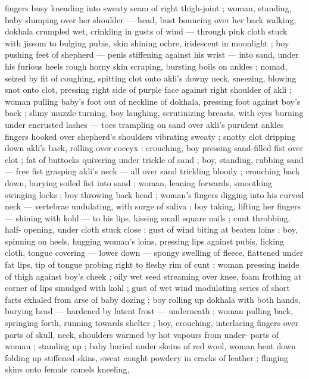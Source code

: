 fingers busy kneading into sweaty seam of right thigh-joint ; woman, 
standing, baby slumping over her shoulder --- head, bust bouncing 
over her back {\dashcom} walking, dokhala crumpled wet, crinkling in gusts 
of wind --- through pink cloth stuck with jissom to bulging pubis, skin 
shining ochre, iridescent in moonlight ; boy pushing feet of shepherd 
--- penis stiffening against his wrist --- into sand, under his furious 
heels {\col} rough horny skin scraping, bursting boils on ankles ; nomad, 
seized by fit of coughing, spitting clot onto akli's downy neck, 
sneezing, blowing snot onto clot, pressing right side of purple face 
against right shoulder of akli ; woman pulling baby's foot out of 
neckline of dokhala, pressing foot against boy's back ; slimy muzzle 
turning, boy laughing, scrutinizing breasts, with eyes burning under 
encrusted lashes --- toes trampling on sand over akli's purulent 
ankles {\col} fingers hooked over shepherd's shoulders vibrating sweaty 
; snotty clot dripping down akli's back, rolling over coccyx : 
crouching, boy pressing sand-filled fist over clot ; fat of buttocks 
quivering under trickle of sand ; boy, standing, rubbing sand --- free 
fist grasping akli's neck --- all over sand trickling bloody ; crouching 
back down, burying soiled fist into sand ; woman, leaning forwards, 
smoothing swinging locks ; boy throwing back head ; woman's 
fingers digging into his curved neck --- vertebrae undulating, with 
surge of saliva ; boy taking, lifting her fingers --- shining with kohl 
--- to his lips, kissing small square nails ; cunt throbbing, half- 
opening, under cloth stuck close ; gust of wind biting at beaten loins 
; boy, spinning on heels, hugging woman's loins, pressing lips 
against pubis, licking cloth, tongue covering --- lower down --- 
spongy swelling of fleece, flattened under fat lips, tip of tongue 
probing right to fleshy rim of cunt ; woman pressing inside of thigh 
against boy's cheek ; oily wet seed streaming over knee, foam 
frothing at corner of lips smudged with kohl ; gust of wet wind 
modulating series of short farts exhaled from arse of baby dozing ; 
boy rolling up dokhala with both hands, burying head --- hardened 
by latent frost --- underneath ; woman pulling back, springing forth, 
running towards shelter ; boy, crouching, interlacing fingers over 
parts of skull, neck, shoulders warmed by hot vapours from under- 
parts of woman ; standing up ; baby buried under skeins of red wool, 
woman bent down folding up stiffened skins, sweat caught powdery 
in cracks of leather ; flinging skins onto female camels kneeling, 

